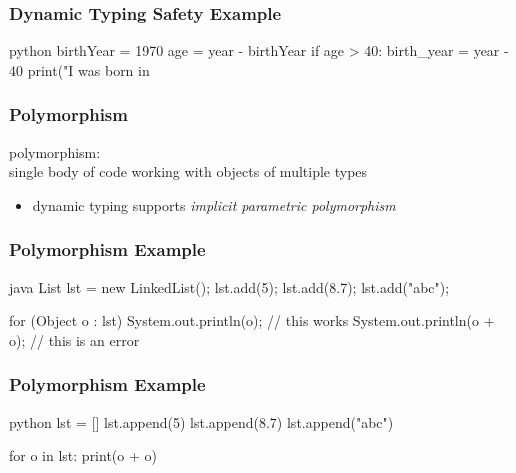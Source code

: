 \documentclass[dvipsnames]{beamer}
\theoremstyle{plain}
\begin{document}
\begin{frame}[fragile]
  \frametitle{Dynamic Typing Safety Example}

  \begin{example}[Python]
    \begin{pygments}{python}
birthYear = 1970
age = year - birthYear
if age > 40:
    birth_year = year - 40
print("I was born in %
    \end{pygments}
  \end{example}
\end{frame}

\begin{frame}
  \frametitle{Polymorphism}

  \begin{definition}
    \alert{polymorphism}:\\
      single body of code working with objects of multiple types
  \end{definition}

  \begin{itemize}
    \item dynamic typing supports \emph{implicit parametric polymorphism}
  \end{itemize}
\end{frame}

\begin{frame}[fragile]
  \frametitle{Polymorphism Example}

  \begin{example}[Java]
    \begin{pygments}{java}
List lst = new LinkedList();
lst.add(5);
lst.add(8.7);
lst.add("abc");

for (Object o : lst) {
    System.out.println(o);        // this works
    System.out.println(o + o);    // this is an error
}
    \end{pygments}
  \end{example}
\end{frame}

\begin{frame}[fragile]
  \frametitle{Polymorphism Example}

  \begin{example}[Python]
    \begin{pygments}{python}
lst = []
lst.append(5)
lst.append(8.7)
lst.append("abc")

for o in lst:
    print(o + o)
    \end{pygments}
  \end{example}
\end{frame}
\end{document}
